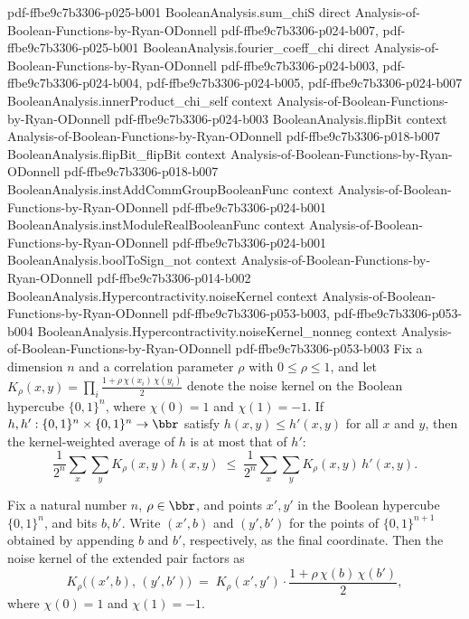\begin{lemma}
  {pdf-ffbe9c7b3306-p025-b001}
\proofstep
  {BooleanAnalysis.sum_chiS}
  {direct}
  {Analysis-of-Boolean-Functions-by-Ryan-ODonnell}
  {pdf-ffbe9c7b3306-p024-b007,
    pdf-ffbe9c7b3306-p025-b001}
\proofstep
  {BooleanAnalysis.fourier_coeff_chi}
  {direct}
  {Analysis-of-Boolean-Functions-by-Ryan-ODonnell}
  {pdf-ffbe9c7b3306-p024-b003,
    pdf-ffbe9c7b3306-p024-b004,
    pdf-ffbe9c7b3306-p024-b005,
    pdf-ffbe9c7b3306-p024-b007}
\proofstep
  {BooleanAnalysis.innerProduct_chi_self}
  {context}
  {Analysis-of-Boolean-Functions-by-Ryan-ODonnell}
  {pdf-ffbe9c7b3306-p024-b003}
\proofstep
  {BooleanAnalysis.flipBit}
  {context}
  {Analysis-of-Boolean-Functions-by-Ryan-ODonnell}
  {pdf-ffbe9c7b3306-p018-b007}
\proofstep
  {BooleanAnalysis.flipBit_flipBit}
  {context}
  {Analysis-of-Boolean-Functions-by-Ryan-ODonnell}
  {pdf-ffbe9c7b3306-p018-b007}
\proofstep
  {BooleanAnalysis.instAddCommGroupBooleanFunc}
  {context}
  {Analysis-of-Boolean-Functions-by-Ryan-ODonnell}
  {pdf-ffbe9c7b3306-p024-b001}
\proofstep
  {BooleanAnalysis.instModuleRealBooleanFunc}
  {context}
  {Analysis-of-Boolean-Functions-by-Ryan-ODonnell}
  {pdf-ffbe9c7b3306-p024-b001}
\proofstep
  {BooleanAnalysis.boolToSign_not}
  {context}
  {Analysis-of-Boolean-Functions-by-Ryan-ODonnell}
  {pdf-ffbe9c7b3306-p014-b002}
\proofstep
  {BooleanAnalysis.Hypercontractivity.noiseKernel}
  {context}
  {Analysis-of-Boolean-Functions-by-Ryan-ODonnell}
  {pdf-ffbe9c7b3306-p053-b003,
    pdf-ffbe9c7b3306-p053-b004}
\proofstep
  {BooleanAnalysis.Hypercontractivity.noiseKernel_nonneg}
  {context}
  {Analysis-of-Boolean-Functions-by-Ryan-ODonnell}
  {pdf-ffbe9c7b3306-p053-b003}
\label{BooleanAnalysis.Hypercontractivity.corrExpect_mono}
Fix a dimension $n$ and a correlation parameter $\rho$ with $0 \le \rho \le 1$, and let
$K_\rho(x,y) = \prod_{i} \tfrac{1 + \rho\,\chi(x_i)\,\chi(y_i)}{2}$ denote the noise
kernel on the Boolean hypercube $\{0,1\}^n$, where $\chi(0)=1$ and $\chi(1)=-1$. If $h,
h' : \{0,1\}^n \times \{0,1\}^n \to \bbr$ satisfy $h(x,y) \le h'(x,y)$
for all $x$ and $y$, then the kernel-weighted average of $h$ is at most that of $h'$:
\[
  \frac{1}{2^n}\sum_{x}\sum_{y} K_\rho(x,y)\, h(x,y)
  \;\le\;
  \frac{1}{2^n}\sum_{x}\sum_{y} K_\rho(x,y)\, h'(x,y).
\]
\end{lemma}

\begin{lemma}
\leanok
{}
\label{BooleanAnalysis.Hypercontractivity.noiseKernel_snoc}
Fix a natural number $n$, $\rho \in \bbr$, and points $x', y'$ in the Boolean hypercube
$\{0,1\}^n$, and bits $b,
b'$. Write $(x', b)$ and $(y', b')$ for the points of $\{0,1\}^{n+1}$ obtained by
appending $b$ and $b'$, respectively, as the final coordinate. Then the noise kernel of
the extended pair factors as
\[
  K_\rho\bigl((x', b),\, (y', b')\bigr)
  \;=\; K_\rho(x', y') \cdot \frac{1 + \rho\,\chi(b)\,\chi(b')}{2},
\]
where $\chi(0)=1$ and $\chi(1)=-1$.
\end{lemma}

